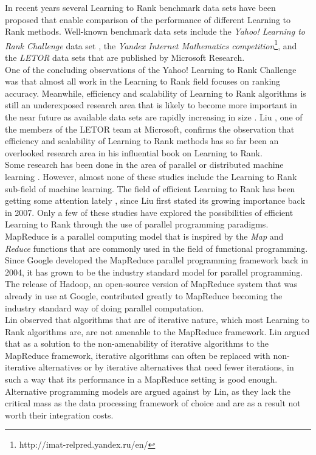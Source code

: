 In recent years several Learning to Rank benchmark data sets have been proposed that enable comparison of the performance of different Learning to Rank methods. Well-known benchmark data sets include the \emph{Yahoo! Learning to Rank Challenge} data set \cite{Chapelle2011a}, the \emph{Yandex Internet Mathematics competition}\footnote{http://imat-relpred.yandex.ru/en/}, and the \emph{LETOR} data sets \cite{Qin2010} that are published by Microsoft Research.\\

One of the concluding observations of the Yahoo! Learning to Rank Challenge was that almost all work in the Learning to Rank field focuses on ranking accuracy. Meanwhile, efficiency and scalability of Learning to Rank algorithms is still an underexposed research area that is likely to become more important in the near future as available data sets are rapidly increasing in size \cite{Chapelle2011b}. Liu \cite{Liu2007}, one of the members of the LETOR team at Microsoft, confirms the observation that efficiency and scalability of Learning to Rank methods has so far been an overlooked research area in his influential book on Learning to Rank.\\

Some research has been done in the area of parallel or distributed machine learning \cite{Chu2007,Chang2007}. However, almost none of these studies include the Learning to Rank sub-field of machine learning. The field of efficient Learning to Rank has been getting some attention lately \cite{Asadi2013a,Asadi2013b,Busa-Fekete2012,Sousa2012,Shukla2012}, since Liu \cite{Liu2007} first stated its growing importance back in 2007. Only a few of these studies \cite{Sousa2012,Shukla2012} have explored the possibilities of efficient Learning to Rank through the use of parallel programming paradigms.\\

MapReduce \cite{Dean2004} is a parallel computing model that is inspired by the \emph{Map} and \emph{Reduce} functions that are commonly used in the field of functional programming. Since Google developed the MapReduce parallel programming framework back in 2004, it has grown to be the industry standard model for parallel programming. The release of Hadoop, an open-source version of MapReduce system that was already in use at Google, contributed greatly to MapReduce becoming the industry standard way of doing parallel computation.\\

Lin \cite{Lin2013} observed that algorithms that are of iterative nature, which most Learning to Rank algorithms are, are not amenable to the MapReduce framework. Lin argued that as a solution to the non-amenability of iterative algorithms to the MapReduce framework, iterative algorithms can often be replaced with non-iterative alternatives or by iterative alternatives that need fewer iterations, in such a way that its performance in a MapReduce setting is good enough. Alternative programming models are argued against by Lin, as they lack the critical mass as the data processing framework of choice and are as a result not worth their integration costs.\\


